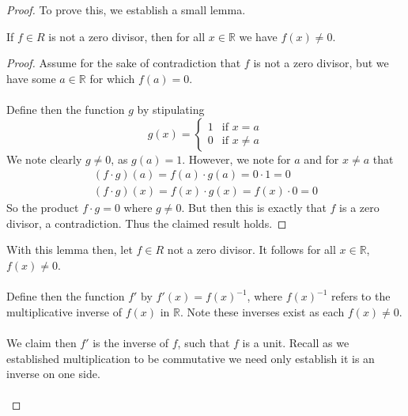 \documentclass[12pt]{article}
\newenvironment{ex}[2][Exercise]{\begin{trivlist}
\item[\hskip \labelsep {\bfseries #1}\hskip \labelsep {\bfseries #2.}]}{\end{trivlist}}
\newenvironment{lemma}[2][Lemma]{\begin{trivlist}
\item[\hskip \labelsep {\bfseries #1}\hskip \labelsep {\bfseries #2.}]}{\end{trivlist}}
\begin{document}
\begin{ex}{1}
\begin{enumerate}[label=(\alph*)]
        \begin{proof}
            To prove this, we establish a small lemma. 
            \begin{lemma}{1}
                If $f \in R$ is not a zero divisor, then for all $x \in \mathbb{R}$ we have $f(x) \neq 0$.
                \begin{proof}
                    Assume for the sake of contradiction that $f$ is not a zero divisor, but we have some $a \in \mathbb{R}$ for which $f(a) = 0$. \\ \\
                    Define then the function $g$ by stipulating 
                    \begin{equation*}
                        g(x) = \begin{cases}
                            1 & \text{if } x = a \\
                            0 & \text{if } x \neq a 
                        \end{cases}
                    \end{equation*}
                    We note clearly $g \neq 0$, as $g(a) = 1$. However, we note for $a$ and for $x \neq a$ that 
                    \begin{align*}
                        (f \cdot g)(a) = f(a) \cdot g(a) = 0 \cdot 1 = 0 \\
                        (f \cdot g)(x) = f(x) \cdot g(x) = f(x) \cdot 0 = 0 
                    \end{align*}
                    So the product $f \cdot g = 0$ where $g \neq 0$. But then this is exactly that $f$ is a zero divisor, a contradiction. Thus the claimed result holds.
                \end{proof}
            \end{lemma}
            With this lemma then, let $f \in R$ not a zero divisor. It follows for all $x \in \mathbb{R}$, $f(x) \neq 0$. \\ \\
            Define then the function $f'$ by $f'(x) = f(x)^{-1}$, where $f(x)^{-1}$ refers to the multiplicative inverse of $f(x)$ in $\mathbb{R}$. Note these inverses exist as each $f(x) \neq 0$. \\ \\
            We claim then $f'$ is the inverse of $f$, such that $f$ is a unit. Recall as we established multiplication to be commutative we need only establish it is an inverse on one side. \\ \\

\end{proof}
\end{enumerate}
\end{ex}
\end{document}
